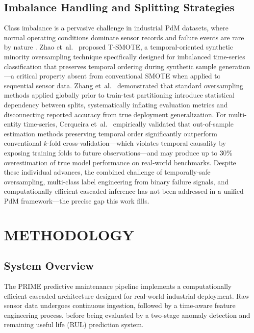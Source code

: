 \documentclass[conference]{IEEEtran}
\begin{document}
\subsection{Imbalance Handling and Splitting Strategies}
Class imbalance is a pervasive challenge in industrial PdM datasets, where
normal operating conditions dominate sensor records and failure events are rare
by nature \cite{li2020pdmimbalance}. Zhao et~al.\ \cite{chawla2002smote}
proposed T-SMOTE, a temporal-oriented synthetic minority oversampling technique
specifically designed for imbalanced time-series classification that preserves
temporal ordering during synthetic sample generation---a critical property
absent from conventional SMOTE when applied to sequential sensor data.
Zhang et~al.\ \cite{blagus2013smote_bias} demonstrated that standard
oversampling methods applied globally prior to train-test partitioning
introduce statistical dependency between splits, systematically inflating
evaluation metrics and disconnecting reported accuracy from true deployment
generalization. For multi-entity time-series, Cerqueira et~al.\
\cite{bergmeir2018tscv} empirically validated that out-of-sample estimation
methods preserving temporal order significantly outperform conventional
$k$-fold cross-validation---which violates temporal causality by exposing
training folds to future observations---and may produce up to 30\%
overestimation of true model performance on real-world benchmarks. Despite
these individual advances, the combined challenge of temporally-safe
oversampling, multi-class label engineering from binary failure signals,
and computationally efficient cascaded inference has not been addressed in a
unified PdM framework---the precise gap this work fills.

\section{METHODOLOGY}

\subsection{System Overview}
The PRIME predictive maintenance pipeline implements a computationally efficient cascaded architecture designed for real-world industrial deployment. Raw sensor data undergoes continuous ingestion, followed by a time-aware feature engineering process, before being evaluated by a two-stage anomaly detection and remaining useful life (RUL) prediction system.
\end{document}
